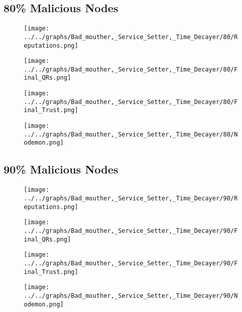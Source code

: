 \begin{minipage}[t]{0.49\columnwidth}
\subsection*{80\% Malicious Nodes}
    \begin{figure}[H]
        \centering
        \texttt{[image: ../../graphs/Bad\_mouther,\_Service\_Setter,\_Time\_Decayer/80/Reputations.png]}
    \end{figure}
    \begin{figure}[H]
        \centering
        \texttt{[image: ../../graphs/Bad\_mouther,\_Service\_Setter,\_Time\_Decayer/80/Final\_QRs.png]}
    \end{figure}
\end{minipage}
\begin{minipage}[t]{0.49\columnwidth}
    \begin{figure}[H]
        \centering
        \texttt{[image: ../../graphs/Bad\_mouther,\_Service\_Setter,\_Time\_Decayer/80/Final\_Trust.png]}
    \end{figure}
    \begin{figure}[H]
        \centering
        \texttt{[image: ../../graphs/Bad\_mouther,\_Service\_Setter,\_Time\_Decayer/80/Nodemon.png]}
    \end{figure}
\end{minipage}

\begin{minipage}[t]{0.49\columnwidth}
\subsection*{90\% Malicious Nodes}
    \begin{figure}[H]
        \centering
        \texttt{[image: ../../graphs/Bad\_mouther,\_Service\_Setter,\_Time\_Decayer/90/Reputations.png]}
    \end{figure}
    \begin{figure}[H]
        \centering
        \texttt{[image: ../../graphs/Bad\_mouther,\_Service\_Setter,\_Time\_Decayer/90/Final\_QRs.png]}
    \end{figure}
\end{minipage}
\begin{minipage}[t]{0.49\columnwidth}
    \begin{figure}[H]
        \centering
        \texttt{[image: ../../graphs/Bad\_mouther,\_Service\_Setter,\_Time\_Decayer/90/Final\_Trust.png]}
    \end{figure}
    \begin{figure}[H]
        \centering
        \texttt{[image: ../../graphs/Bad\_mouther,\_Service\_Setter,\_Time\_Decayer/90/Nodemon.png]}
    \end{figure}
\end{minipage}
\newpage

